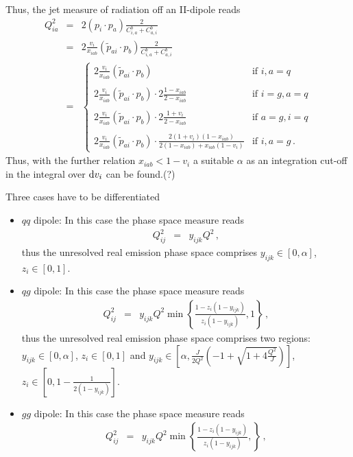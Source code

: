 \documentclass[a4paper,10pt]{scrartcl}
\newcommand{\done}{{\rm d}}
\newcommand{\nnb}{\nonumber}
\begin{document}
Thus, the jet measure of radiation off an II-dipole reads
\begin{eqnarray}
 Q_{ia}^2
& = & 2(p_i\cdot p_a)\frac{2}{C_{i,a}^b+C_{a,i}^b} \nnb\\
& = & 2\frac{v_i}{x_{iab}}(\tilde p_{ai}\cdot p_b)
	\frac{2}{C_{i,a}^b+C_{a,i}^b} \nnb\\
& = & \left\{\begin{array}{ll}
		2\frac{v_i}{x_{iab}}(\tilde p_{ai}\cdot p_b) & \mbox{if }i,a=q \\
		& \\
		2\frac{v_i}{x_{iab}}(\tilde p_{ai}\cdot p_b)\cdot
			2\frac{1-x_{iab}}{2-x_{iab}} & \mbox{if }i=g, a=q \\
		& \\
		2\frac{v_i}{x_{iab}}(\tilde p_{ai}\cdot p_b)\cdot
			2\frac{1+v_i}{2-x_{iab}} & \mbox{if }a=g, i=q \\
		& \\
		2\frac{v_i}{x_{iab}}(\tilde p_{ai}\cdot p_b)\cdot
			\frac{2(1+v_i)(1-x_{iab})}{2(1-x_{iab})+x_{iab}(1-v_i)} & \mbox{if }i,a=g\,.
             \end{array}\right.
\end{eqnarray}
Thus, with the further relation $x_{iab} < 1-v_i$ a suitable $\alpha$
as an integration cut-off in the integral over $\done v_i$ can be found.(?)

Three cases have to be differentiated
\begin{itemize}
 \item $qq$ dipole: In this case the phase space measure reads
	\begin{eqnarray}
	 Q_{ij}^2
	& = & y_{ijk} Q^2 \,,
	\end{eqnarray}
 	thus the unresolved real emission phase space comprises
	$y_{ijk} \in [0,\alpha]$, 
	$z_i \in [0,1]$.
 \item $qg$ dipole: In this case the phase space measure reads
	\begin{eqnarray}
	 Q_{ij}^2
	& = & y_{ijk} Q^2 
		\min\left\{\frac{1-z_i(1-y_{ijk})}
				{z_i(1-y_{ijk})},1\right\} \,,
	\end{eqnarray}
	thus the unresolved real emission phase space comprises
	two regions: $y_{ijk} \in [0,\alpha]$, $z_i \in [0,1]$ 
	and $ y_{ijk} \in [\alpha,\frac{J}{2Q^2}\left(-1+
					\sqrt{1+4\frac{Q^2}{J}}\right)]$, 
	$z_i \in [0,1-\frac{1}{2(1-y_{ijk})}]$.
 \item $gg$ dipole: In this case the phase space measure reads
	\begin{eqnarray}
	 Q_{ij}^2
	& = & y_{ijk} Q^2 
		\min\left\{\frac{1-z_i(1-y_{ijk})}
				{z_i(1-y_{ijk})},\right\} \,,
	\end{eqnarray}
\end{itemize}
\end{document}
